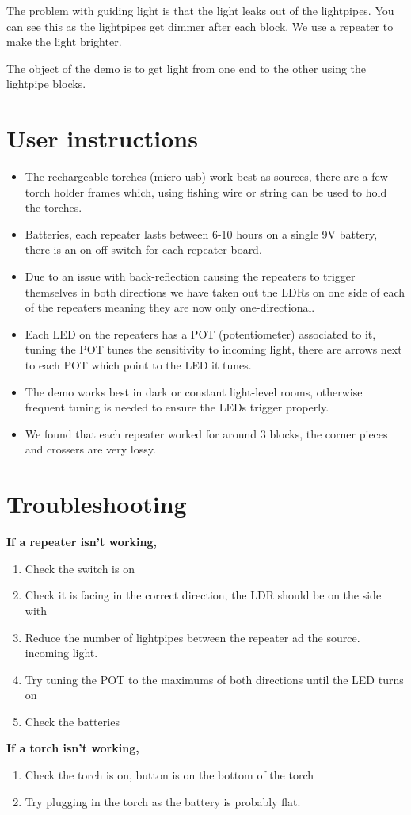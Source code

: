 \documentclass[12pt]{article}
\begin{document}
The problem with guiding light is that the light leaks out of the lightpipes. You can see this as the lightpipes get dimmer after each block. We use a repeater to make the light brighter.  

The object of the demo is to get light from one end to the other using the lightpipe blocks.

\section{User instructions}

\begin{itemize}
    \item The rechargeable torches (micro-usb) work best as sources, there are a few torch holder
        frames which, using fishing wire or string can be used to hold the torches.
    \item Batteries, each repeater lasts between 6-10 hours on a single 9V battery, there
        is an on-off switch for each repeater board.
    \item Due to an issue with back-reflection causing the repeaters to trigger
        themselves in both directions we have taken out the LDRs on one side of each of
        the repeaters meaning they are now only one-directional.
    \item Each LED on the repeaters has a POT (potentiometer) associated to it, tuning
        the POT tunes the sensitivity to incoming light, there are arrows next to each
        POT which point to the LED it tunes.
    \item The demo works best in dark or constant light-level rooms, otherwise frequent
        tuning is needed to ensure the LEDs trigger properly.
    \item We found that each repeater worked for around 3 blocks, the corner pieces and
        crossers are very lossy.
\end{itemize}


\section{Troubleshooting}

\textbf{If a repeater isn't working,}
\begin{enumerate}
\item Check the switch is on
\item Check it is facing in the correct direction, the LDR should be on the side with
\item Reduce the number of lightpipes between the repeater ad the source.
    incoming light.
\item Try tuning the POT to the maximums of both directions until the LED turns on
\item Check the batteries 
\end{enumerate}
%
\textbf{If a torch isn't working,}
\begin{enumerate}
    \item Check the torch is on, button is on the bottom of the torch
    \item Try plugging in the torch as the battery is probably flat.
\end{enumerate}
\end{document}
